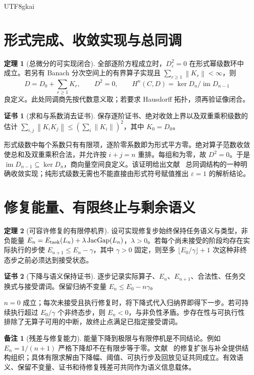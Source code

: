 \documentclass[12pt]{report}
\makeatletter
\theoremstyle{definition}
\newtheorem{theorem}{定理}[chapter]
\newtheorem{remark}{备注}[chapter]
\newtheorem{Certificate}{证书}[chapter]
\renewenvironment{proof}[1][\proofname]{\par
  \pushQED{\qed}\normalfont
  \topsep6\p@\@plus6\p@\relax
  \trivlist
  \item[\hskip\labelsep\normalfont #1\@addpunct{.}]\ignorespaces
}{
  \popQED\endtrivlist\@endpefalse
}
\newcommand{\im}{\operatorname{im}}
\newcommand{\JacGap}{\operatorname{JacGap}}
\newcommand{\norm}[1]{\left\lVert#1\right\rVert}
\makeatother
\begin{document}
\begin{CJK*}{UTF8}{gkai}
\section{形式完成、收敛实现与总同调}
\begin{theorem}[总微分的可实现闭合]
\label{thm:total}
全部逐阶方程成立时，\(D_\varepsilon^2=0\) 在形式幂级数环中成立。若另有 Banach 分次空间上的有界算子实现且
\(\sum_{r\ge1}\norm{K_r}<\infty\)，则
\[
D=D_0+\sum_{r\ge1}K_r,\qquad D^2=0,
\qquad H^n(C,D)=\ker D_n/\im D_{n-1}
\]
良定义。此处同调商先按代数意义取；若要求 Hausdorff 拓扑，须再验证像闭合。
\end{theorem}
\begin{Certificate}[求和与系数消去证书]
保存逐阶证书、绝对收敛上界以及双重乘积级数的估计
\(\sum_{i,j}\norm{K_iK_j}\le(\sum_i\norm{K_i})^2\)，其中 \(K_0=D_0\)。
\end{Certificate}
\begin{proof}
形式级数中每个系数只有有限项，逐阶零系数即为形式平方零。绝对算子范数收敛使总和及双重乘积合法，并允许按 \(i+j=n\) 重排。每组和为零，故 \(D^2=0\)。于是 \(\im D_{n-1}\subseteq\ker D_n\)，商向量空间良定义。该证明给出文献~\cite{total} 总同调结构的一种明确收敛实现；纯形式级数无需也不能直接由形式符号赋值推出 \(\varepsilon=1\) 的解析结论。
\end{proof}

\section{修复能量、有限终止与剩余语义}
\begin{theorem}[可容许修复的有限停机界]
\label{thm:stop}
设可实现修复步始终保持任务语义与类型，非负能量
\(E_n=E_{\rm task}(L_n)+\lambda\JacGap(L_n)\)，\(\lambda>0\)。若每个尚未接受的阶段均存在实际执行的步使 \(E_{n+1}\le E_n-\gamma\)，其中 \(\gamma>0\) 固定，则至多 \(\lfloor E_0/\gamma\rfloor+1\) 次这种非终态步之前必须达到接受状态。
\end{theorem}
\begin{Certificate}[下降与语义保持证书]
逐步记录实际算子、\(E_n\)、\(E_{n+1}\)、合法性、任务交换式与接受谓词。保留归纳不变量 \(E_n\le E_0-n\gamma\)。
\end{Certificate}
\begin{proof}
\(n=0\) 成立；每次未接受且执行修复时，将下降式代入归纳界即得下一步。若可持续执行超过 \(E_0/\gamma\) 个非终态步，则 \(E_n<0\)，与非负性矛盾。步存在性与可执行性排除了无算子可用的中断，故终止点满足已指定接受谓词。
\end{proof}
\begin{remark}[残差与修复能力]
能量下降到极限与有限停机是不同结论。例如 \(E_n=1/(n+1)\) 严格下降却不在有限步等于零。文献~\cite{pure} 的修复扩张与补全提供结构组织；具体有限求解由下降幅、阈值、可执行步及回放见证共同成立。有效语义、保留不变量、证书和待修复残差可共同作为语义信息载体\cite{fos}。
\end{remark}


\end{CJK*}
\end{document}
